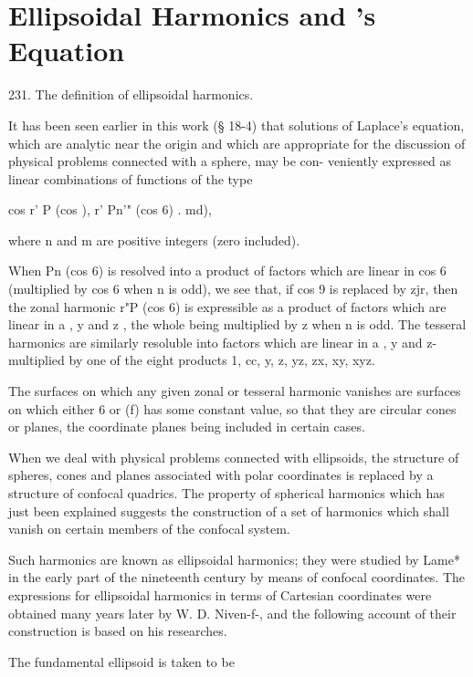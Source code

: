 \chapter{Ellipsoidal Harmonics and \Lame's Equation}

231. The definition of ellipsoidal harmonics. 

It has been seen earlier in this work (§ 18-4) that solutions of Laplace's 
equation, which are analytic near the origin and which are appropriate for 
the discussion of physical problems connected with a sphere, may be con- 
veniently expressed as linear combinations of functions of the type 

cos 
r' P  (cos  ), r' Pn'" (cos 6) . md), 

where n and m are positive integers (zero included). 

When Pn (cos 6) is resolved into a product of factors which are linear in 
cos  6 (multiplied by cos 6 when n is odd), we see that, if cos 9 is replaced by 
zjr, then the zonal harmonic r"P  (cos 6) is expressible as a product of factors 
which are linear in a , y  and z , the whole being multiplied by z when n is 
odd. The tesseral harmonics are similarly resoluble into factors which are 
linear in a , y  and z- multiplied by one of the eight products 1, cc, y, z, yz, zx, 
xy, xyz. 

The surfaces on which any given zonal or tesseral harmonic vanishes are 
surfaces on which either 6 or (f) has some constant value, so that they are 
circular cones or planes, the coordinate planes being included in certain cases. 

When we deal with physical problems connected with ellipsoids, the 
structure of spheres, cones and planes associated with polar coordinates is 
replaced by a structure of confocal quadrics. The property of spherical 
harmonics which has just been explained suggests the construction of a set 
of harmonics which shall vanish on certain members of the confocal system. 

Such harmonics are known as ellipsoidal harmonics; they were studied by 
Lame* in the early part of the nineteenth century by means of confocal 
coordinates. The expressions for ellipsoidal harmonics in terms of Cartesian 
coordinates were obtained many years later by W. D. Niven-f-, and the 
following account of their construction is based on his researches. 

The fundamental ellipsoid is taken to be 



